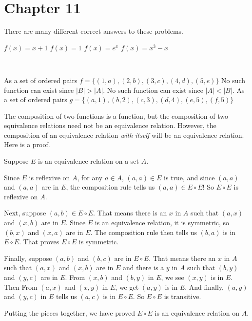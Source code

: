 \section*{Chapter 11}

\begin{Solution}{11.1}
There are many different correct answers to these problems.

  \begin{tasks}
         \task $f(x) = x+1$
         \task $f(x) = 1$
         \task $f(x)= e^{x}$
         \task $f(x) = x^{3} - x$
  \end{tasks}
\end{Solution}

\begin{Solution}{11.2}
\ %
 \begin{tasks}
          \task As a set of ordered pairs $f = \{ (1,a), (2,b), (3,c), (4,d), (5,e)\}$
          \task No such function can exist since $|B| > |A|$.
          \task No such function can exist since $|A|< |B|$.
          \task As a set of ordered pairs $g = \{ (a,1), (b,2), (c,3), (d,4), (e,5), (f,5) \}$
  \end{tasks}
\end{Solution}

\begin{Solution}{11.3}
The composition of two functions is a function, but the composition of two equivalence relations need not be an equivalence relation.
However, the composition of an equivalence relation {\itshape with itself} will be an equivalence relation. Here is a proof.

Suppose $E$ is an equivalence relation on a set $A$.

 Since $E$ is reflexive on $A$, for any $a\in A$, $(a,a)\in E$ is true, and since $(a,a)$ and $(a,a)$ are in $E$, 
 the composition rule tells us $(a,a)\in E\circ E$!  So $E\circ E$ is reflexive on $A$.
 
 Next, suppose $(a,b)\in E\circ E$. That means there is an $x$ in $A$ such that $(a,x)$ and $(x,b)$ are in $E$. Since $E$
 is an equivalence relation, it is symmetric, so $(b,x)$ and $(x,a)$ are in $E$. The composition rule then tells us $(b,a)$
 is in $E\circ E$. That proves $E\circ E$ is symmetric.
 
 Finally, suppose $(a,b)$ and $(b,c)$ are in $E\circ E$. That means there an $x$ in $A$ such that $(a,x)$ and $(x,b)$ are in $E$
 and there is a $y$ in $A$ such that $(b,y)$ and $(y,c)$ are in $E$. From $(x,b)$ and $(b,y)$ in $E$, we see $(x,y)$ is in $E$. Then
 From $(a,x)$ and $(x,y)$ in $E$, we get $(a,y)$ is in $E$. And finally, $(a,y)$ and $(y,c)$ in $E$ tells us $(a,c)$ is in $E\circ E$.
 So $E\circ E$ is transitive.
 
 Putting the pieces together, we have proved $E\circ E$ is an equivalence relation on $A$.

\end{Solution}

